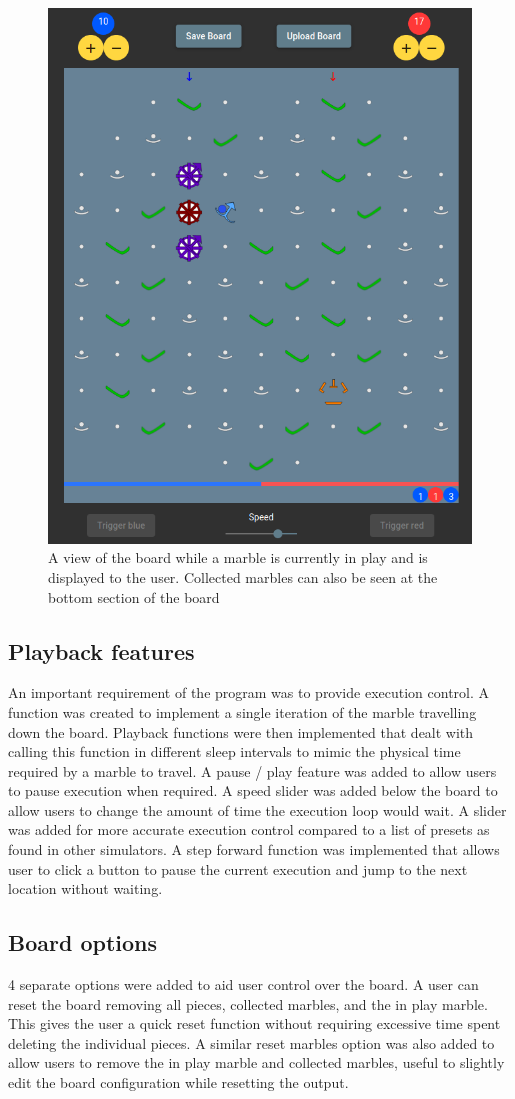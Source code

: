 \documentclass{l4proj}
\begin{document}
\begin{figure}
    \centering
    \includegraphics[width=0.5\linewidth]{images/marbleInPlay.png}
    \caption{A view of the board while a marble is currently in play and is displayed to the user. Collected marbles can also be seen at the bottom section of the board}
    \label{fig:marbleInPlay}
\end{figure}

\subsection{Playback features}
An important requirement of the program was to provide execution control. A function was created to implement a single iteration of the marble travelling down the board. Playback functions were then implemented that dealt with calling this function in different sleep intervals to mimic the physical time required by a marble to travel. A pause / play feature was added to allow users to pause execution when required. A speed slider was added below the board to allow users to change the amount of time the execution loop would wait. A slider was added for more accurate execution control compared to a list of presets as found in other simulators. A step forward function was implemented that allows user to click a button to pause the current execution and jump to the next location without waiting. 

\subsection{Board options}
4 separate options were added to aid user control over the board. A user can reset the board removing all pieces, collected marbles, and the in play marble. This gives the user a quick reset function without requiring excessive time spent deleting the individual pieces. A similar reset marbles option was also added to allow users to remove the in play marble and collected marbles, useful to slightly edit the board configuration while resetting the output.
\end{document}
